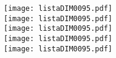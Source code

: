 \documentclass{article}
\begin{document}
	\texttt{[image: listaDIM0095.pdf]}\\
	\texttt{[image: listaDIM0095.pdf]}\\
	\texttt{[image: listaDIM0095.pdf]}\\
	\texttt{[image: listaDIM0095.pdf]}\\
	\texttt{[image: listaDIM0095.pdf]}
\end{document}
